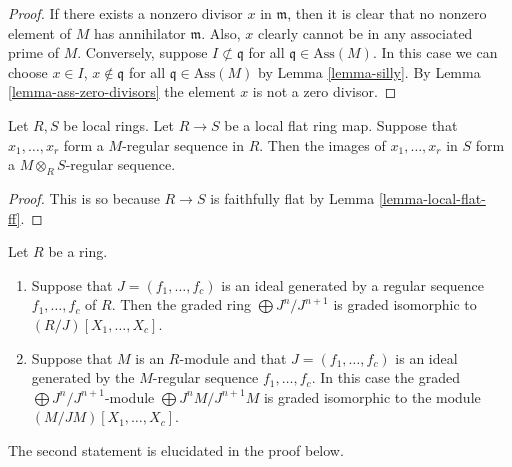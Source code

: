 \begin{proof}
If there exists a nonzero divisor $x$ in $\mathfrak m$,
then it is clear that no nonzero element of $M$ has annihilator
$\mathfrak m$. Also, $x$ clearly cannot be in any associated
prime of $M$. Conversely, suppose $I \not \subset \mathfrak q$
for all $\mathfrak q \in \text{Ass}(M)$. In this case we can
choose $x \in I$, $x \not \in \mathfrak q$ for all
$\mathfrak q \in \text{Ass}(M)$ by Lemma \ref{lemma-silly}.
By Lemma \ref{lemma-ass-zero-divisors} the element $x$
is not a zero divisor.
\end{proof}

\begin{lemma}
\label{lemma-flat-increases-depth}
Let $R, S$ be local rings.
Let $R \to S$ be a local flat ring map.
Suppose that $x_1,\ldots,x_r$ form
a $M$-regular sequence in $R$.
Then the images of $x_1,\ldots,x_r$ in
$S$ form a $M\otimes_RS$-regular sequence.
\end{lemma}

\begin{proof}
This is so because $R\to S$ is faithfully flat
by Lemma \ref{lemma-local-flat-ff}.
\end{proof}

\begin{lemma}
\label{lemma-regular-quasi-regular}
Let $R$ be a ring.
\begin{enumerate}
\item Suppose that $J = (f_1,\ldots,f_c)$ is an ideal generated
by a regular sequence $f_1,\ldots,f_c$ of $R$. Then the graded
ring $\bigoplus J^n/J^{n+1}$ is graded isomorphic to
$(R/J)[X_1,\ldots,X_c]$.
\item Suppose that $M$ is an $R$-module and that $J=(f_1,\ldots,f_c)$
is an ideal generated by the $M$-regular sequence
$f_1,\ldots,f_c$. In this case the graded
$\bigoplus J^n/J^{n+1}$-module $\bigoplus J^nM/J^{n+1}M$
is graded isomorphic to the module $(M/JM)[X_1,\ldots,X_c]$.
\end{enumerate}
The second statement is elucidated in the proof below.
\end{lemma}

